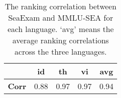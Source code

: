 

\begin{table}[h!]
\centering
\small
\begin{tabular}{lcccc}
\toprule
 & \textbf{id} & \textbf{th} & \textbf{vi} & \textbf{avg} \\
\midrule
\textbf{Corr} & 0.88 & 0.97 & 0.97 & 0.94 \\
\bottomrule
\end{tabular}
\caption{The ranking correlation between SeaExam and MMLU-SEA for each language. ‘avg' means the average ranking correlations across the three languages.}
\label{tab:corr_seaExam}
\end{table}